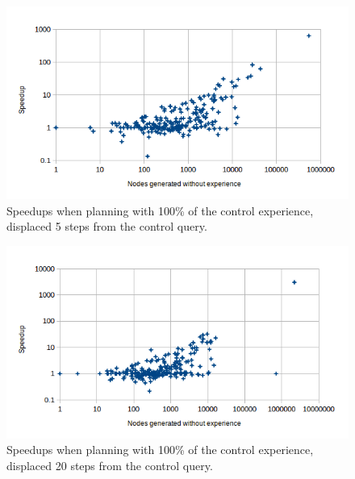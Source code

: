 \documentclass[letterpaper]{article}
\begin{document}
\begin{figure}
	\begin{center}
	\includegraphics[scale=0.5]{Speedup_100_5.png}
	\end{center}
	\caption{Speedups when planning with 100\% of the control experience, displaced 5 steps from the control query.}
	 \label{fig:s_100_5}
\end{figure}

\begin{figure}
	\begin{center}
	\includegraphics[scale=0.5]{Speedup_100_20.png}
	\end{center}
	\caption{Speedups when planning with 100\% of the control experience, displaced 20 steps from the control query.}
	 \label{fig:s_100_20}
\end{figure}
\end{document}
